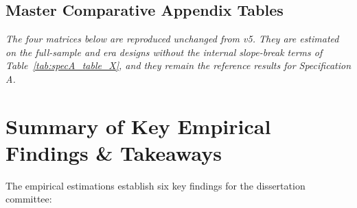 \documentclass[11pt,a4paper]{article}
\begin{document}


\subsection{Master Comparative Appendix Tables}

\textit{The four matrices below are reproduced unchanged from v5. They are estimated on the full-sample and era designs without the internal slope-break terms of Table~\ref{tab:specA_table_X}, and they remain the reference results for Specification A.}









\FloatBarrier
\section{Summary of Key Empirical Findings \& Takeaways}

The empirical estimations establish six key findings for the dissertation committee:
\end{document}
